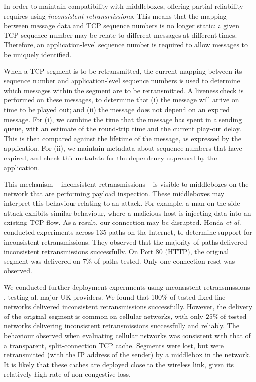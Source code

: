 \documentclass{sig-alternate-05-2015}
\begin{document}
In order to maintain compatibility with middleboxes, offering partial
reliability requires using \emph{inconsistent retransmissions}. This means
that the mapping between message data and TCP sequence numbers is no longer
static: a given TCP sequence number may be relate to different messages at
different times. Therefore, an application-level sequence number is
required to allow messages to be uniquely identified.

When a TCP segment is to be retransmitted, the current mapping between its
sequence number and application-level sequence numbers is used to determine
which messages within the segment are to be retransmitted. A liveness check
is performed on these messages, to determine that (i) the message will
arrive on time to be played out; and (ii) the message does not depend on an
expired message. For (i), we combine the time that the message has spent in
a sending queue, with an estimate of the round-trip time and the current
play-out delay. This is then compared against the lifetime of the message,
as expressed by the application. For (ii), we maintain metadata about
sequence numbers that have expired, and check this metadata for the
dependency expressed by the application.

This mechanism -- inconsistent retransmissions -- is visible to middleboxes
on the network that are performing payload inspection. These middleboxes
may interpret this behaviour relating to an attack. For example, a
man-on-the-side attack exhibits similar behaviour, where a malicious host
is injecting data into an existing TCP flow. As a result, our connection
may be disrupted. Honda \emph{et al}.\ \cite{honda:2011:extend-tcp} conducted
experiments across 135 paths on the Internet, to determine support for
inconsistent retransmissions. They observed that the majority of paths
delivered inconsistent retransmissions successfully. On Port 80 (HTTP), the
original segment was delivered on 7\% of paths tested. Only one connection
reset was observed. 

We conducted further deployment experiments using
inconsistent retransmissions \cite{mcquistin2016hollywood}, testing all 
major UK providers. We found that 100\% of tested fixed-line networks
delivered inconsistent retransmissions successfully. However, the delivery
of the original segment is common on cellular networks, with only 25\% of
tested networks delivering inconsistent retransmissions successfully and
reliably. The behaviour observed when evaluating cellular networks was
consistent with that of a transparent, split-connection TCP cache. Segments
were lost, but were retransmitted (with the IP address of the sender) by a
middlebox in the network. It is likely that these caches are deployed close
to the wireless link, given its relatively high rate of non-congestive
loss.
\end{document}
